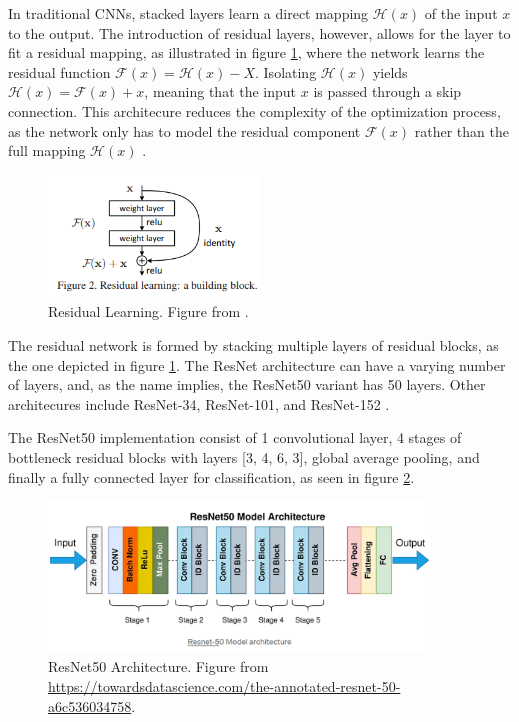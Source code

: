 In traditional CNNs, stacked layers learn a direct mapping $\mathcal{H}(x)$ of the input $x$ to the output. The introduction of residual layers, however, allows for the layer to fit a residual mapping, as illustrated in figure \ref{fig:res_learning}, where the network learns the residual function $\mathcal{F}(x) = \mathcal{H}(x) - X$. Isolating $\mathcal{H}(x)$ yields $\mathcal{H}(x) = \mathcal{F}(x) + x$, meaning that the input $x$ is passed through a skip connection. This architecure reduces the complexity of the optimization process, as the network only has to model the residual component $\mathcal{F}(x)$ rather than the full mapping $\mathcal{H}(x)$ \cite{he2015deepresiduallearningimage}.

\begin{figure}[ht]
    \centering
    \includegraphics[width=0.5\textwidth]{Images/res_learn.png} 
    \caption{Residual Learning. Figure from \cite{he2015deepresiduallearningimage}. }
    \label{fig:res_learning}
\end{figure}

The residual network is formed by stacking multiple layers of residual blocks, as the one depicted in figure \ref{fig:res_learning}. The ResNet architecture can have a varying number of layers, and, as the name implies, the ResNet50 variant has 50 layers. Other architecures include ResNet-34, ResNet-101, and ResNet-152 \cite{he2016identitymappingsdeepresidual}. 

The ResNet50 implementation consist of 1 convolutional layer, 4 stages of bottleneck residual blocks with layers [3, 4, 6, 3], global average pooling, and finally a fully connected layer for classification\cite{torchvision-resnet}, as seen in figure \ref{fig:resnet50}. 

\begin{figure}[ht]
    \centering
    \includegraphics[width=0.9\textwidth]{Images/resnet50.png} 
    \caption{ResNet50 Architecture. Figure from \url{https://towardsdatascience.com/the-annotated-resnet-50-a6c536034758}. }
    \label{fig:resnet50}
\end{figure}

